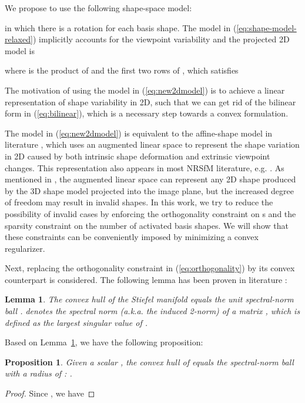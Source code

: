 \documentclass[10pt,journal,cspaper,compsoc]{IEEEtran}
\newcommand{\refLemma}[1]{Lemma~\ref{#1}}
\newcommand{\refEq}[1]{(\ref{#1})}
\newtheorem{lemma}{Lemma}
\newtheorem{proposition}{Proposition}
\begin{document}
We propose to use the following shape-space model:

in which there is a rotation for each basis shape. The model in \refEq{eq:shape-model-relaxed} implicitly accounts for the viewpoint variability and the projected 2D model is

where  is the product of  and the first two rows of , which satisfies


The motivation of using the model in \refEq{eq:new2dmodel} is to achieve a linear representation of shape variability in 2D, such that we can get rid of the bilinear form in \refEq{eq:bilinear}, which is a necessary step towards a convex formulation.

The model in \refEq{eq:new2dmodel} is equivalent to the affine-shape model in literature \cite{blake2000active,xiao2004real}, which uses an augmented linear space to represent the shape variation in 2D caused by both intrinsic shape deformation and extrinsic viewpoint changes. This representation also appears in most NRSfM literature, e.g. \cite{bregler2000recovering,paladini2012optimal}. As mentioned in \cite{xiao2004real}, the augmented linear space can represent any 2D shape produced by the 3D shape model projected into the image plane, but the increased degree of freedom may result in invalid shapes. In this work, we try to reduce the possibility of invalid cases by enforcing the orthogonality constraint on s and the sparsity constraint on the number of activated basis shapes. We will show that these constraints can be conveniently imposed by minimizing a convex regularizer.

Next, replacing the orthogonality constraint in \refEq{eq:orthogonality} by its convex counterpart is considered. The following lemma has been proven in literature \cite[Section 3.4]{journee2010generalized}:

\begin{lemma}\label{lemma1}
The convex hull of the Stiefel manifold  equals the unit spectral-norm ball .  denotes the spectral norm (a.k.a. the induced 2-norm) of a matrix , which is defined as the largest singular value of .
\end{lemma}
Based on \refLemma{lemma1}, we have the following proposition:
\begin{proposition}
Given a scalar , the convex hull of  equals the spectral-norm ball with a radius of : .
\end{proposition}
\begin{proof}
Since , we have

\end{proof}
\end{document}
